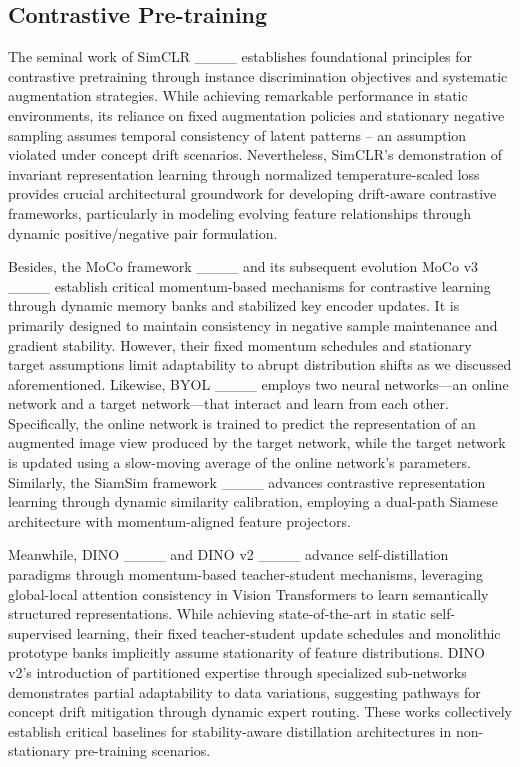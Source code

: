\subsection{Contrastive Pre-training}

The seminal work of SimCLR ____ establishes foundational principles for contrastive pretraining through instance discrimination objectives and systematic augmentation strategies. While achieving remarkable performance in static environments, its reliance on fixed augmentation policies and stationary negative sampling assumes temporal consistency of latent patterns – an assumption violated under concept drift scenarios. Nevertheless, SimCLR's demonstration of invariant representation learning through normalized temperature-scaled loss provides crucial architectural groundwork for developing drift-aware contrastive frameworks, particularly in modeling evolving feature relationships through dynamic positive/negative pair formulation.

Besides, the MoCo framework ____ and its subsequent evolution MoCo v3 ____ establish critical momentum-based mechanisms for contrastive learning through dynamic memory banks and stabilized key encoder updates. It is primarily designed to maintain consistency in negative sample maintenance and gradient stability. However, their fixed momentum schedules and stationary target assumptions limit adaptability to abrupt distribution shifts as we discussed aforementioned. Likewise, BYOL ____ employs two neural networks—an online network and a target network—that interact and learn from each other. Specifically, the online network is trained to predict the representation of an augmented image view produced by the target network, while the target network is updated using a slow-moving average of the online network's parameters. Similarly, the SiamSim framework ____ advances contrastive representation learning through dynamic similarity calibration, employing a dual-path Siamese architecture with momentum-aligned feature projectors. 

Meanwhile, DINO ____ and DINO v2 ____ advance self-distillation paradigms through momentum-based teacher-student mechanisms, leveraging global-local attention consistency in Vision Transformers to learn semantically structured representations. While achieving state-of-the-art in static self-supervised learning, their fixed teacher-student update schedules and monolithic prototype banks implicitly assume stationarity of feature distributions. DINO v2's introduction of partitioned expertise through specialized sub-networks demonstrates partial adaptability to data variations, suggesting pathways for concept drift mitigation through dynamic expert routing. These works collectively establish critical baselines for stability-aware distillation architectures in non-stationary pre-training scenarios.

